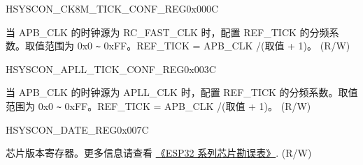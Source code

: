     \begin{register}{H}{SYSCON\_CK8M\_TICK\_CONF\_REG}{0x000C}\label{regdesc:SYSCONCK8MTICKCONFREG}
    \regnewline%
    \begin{regdesc}\begin{reglist}
    \label{fielddesc:SYSCONCK8MTICKNUM}\item [SYSCON\_CK8M\_TICK\_NUM] 当 APB\_CLK 的时钟源为 RC\_FAST\_CLK 时，配置 REF\_TICK 的分频系数。取值范围为 0x0 \verb+~+ 0xFF。REF\_TICK = APB\_CLK /(取值 + 1)。 (R/W)
    \end{reglist}\end{regdesc}
    \end{register}


    \begin{register}{H}{SYSCON\_APLL\_TICK\_CONF\_REG}{0x003C}\label{regdesc:SYSCONAPLLTICKCONFREG}
    \regnewline%
    \begin{regdesc}\begin{reglist}
    \label{fielddesc:SYSCONAPLLTICKNUM}\item [SYSCON\_APLL\_TICK\_NUM] 当 APB\_CLK 的时钟源为 APLL\_CLK 时，配置 REF\_TICK 的分频系数。取值范围为 0x0 \verb+~+ 0xFF。REF\_TICK = APB\_CLK /(取值 + 1)。 (R/W)
    \end{reglist}\end{regdesc}
    \end{register}


    \begin{register}{H}{SYSCON\_DATE\_REG}{0x007C}\label{regdesc:SYSCONDATEREG}
    \regnewline%
    \begin{regdesc}\begin{reglist}
    \label{fielddesc:SYSCONDATE}\item [SYSCON\_DATE] 芯片版本寄存器。更多信息请查看 \href{https://www.espressif.com/sites/default/files/documentation/esp32\_errata\_cn.pdf}{《ESP32 系列芯片勘误表》}. (R/W)
    \end{reglist}\end{regdesc}
    \end{register}
